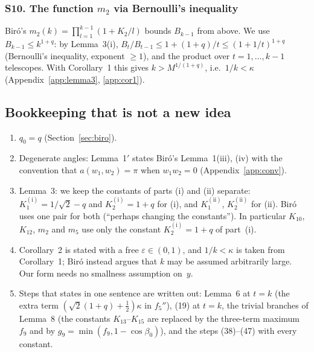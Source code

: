 \documentclass[11pt]{amsart}
\theoremstyle{remark}
\theoremstyle{plain}
\newcommand{\eps}{\varepsilon}
\newcommand{\Ka}{K_1^{(\mathrm{i})}}
\newcommand{\Kb}{K_2^{(\mathrm{i})}}
\newcommand{\Kc}{K_1^{(\mathrm{ii})}}
\newcommand{\Kd}{K_2^{(\mathrm{ii})}}
\begin{document}
\subsubsection*{S10. The function $m_2$ via Bernoulli's inequality}
Bir\'o's $m_2(k)=\prod_{l=1}^{k-1}(1+K_2/l)$ bounds $B_{k-1}$ from above. We use $B_{k-1}\le k^{1+q}$: by Lemma~3(i), $B_t/B_{t-1}\le1+(1+q)/t\le(1+1/t)^{1+q}$ (Bernoulli's inequality, exponent $\ge1$), and the product over $t=1,\dots,k-1$ telescopes. With Corollary~1 this gives $k>M^{1/(1+q)}$, i.e.\ $1/k<\kappa$ (Appendix~\ref{app:lemma3}, \ref{app:cor1}).

\subsection{Bookkeeping that is not a new idea}\label{sec:bookkeeping}
\begin{enumerate}[label=(B\arabic*),leftmargin=*]
\item $q_0=q$ (Section~\ref{sec:biro}).
\item Degenerate angles: Lemma~1$'$ states Bir\'o's Lemma~1(iii), (iv) with the convention that $a(w_1,w_2)=\pi$ when $w_1w_2=0$ (Appendix~\ref{app:conv}).
\item Lemma~3: we keep the constants of parts (i) and (ii) separate: $\Ka=1/\sqrt2-q$ and $\Kb=1+q$ for (i), and $\Kc$, $\Kd$ for (ii). Bir\'o uses one pair for both (``perhaps changing the constants''). In particular $K_{10}$, $K_{12}$, $m_2$ and $m_5$ use only the constant $\Kb=1+q$ of part~(i).
\item Corollary~2 is stated with a free $\eps\in(0,1)$, and $1/k<\kappa$ is taken from Corollary~1; Bir\'o instead argues that $k$ may be assumed arbitrarily large. Our form needs no smallness assumption on~$y$.
\item Steps that \cite{Bir00b} states in one sentence are written out: Lemma~6 at $t=k$ (the extra term $(\sqrt2(1+q)+\frac12)\kappa$ in $f_5''$), (19) at $t=k$, the trivial branches of Lemma~8 (the constants $K_{13}$--$K_{15}$ are replaced by the three-term maximum $f_9$ and by $g_9=\min(f_9,1-\cos\beta_0)$), and the steps (38)--(47) with every constant.
\end{enumerate}
\end{document}

